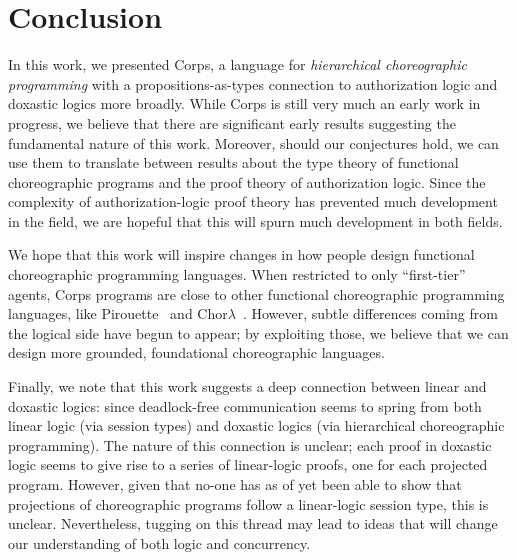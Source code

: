 \section{Conclusion}
\label{sec:conclusion}

In this work, we presented Corps, a language for \emph{hierarchical choreographic programming} with a propositions-as-types connection to authorization logic and doxastic logics more broadly.
While Corps is still very much an early work in progress, we believe that there are significant early results suggesting the fundamental nature of this work.
Moreover, should our conjectures hold, we can use them to translate between results about the type theory of functional choreographic programs and the proof theory of authorization logic.
Since the complexity of authorization-logic proof theory has prevented much development in the field, we are hopeful that this will spurn much development in both fields.

We hope that this work will inspire changes in how people design functional choreographic programming languages.
When restricted to only ``first-tier'' agents, Corps programs are close to  other functional choreographic programming languages, like Pirouette~\cite{HirschG22} and Chor$\lambda$~\cite{GraversenHM23,CruzFilipeGLMP21}.
However, subtle differences coming from the logical side have begun to appear; by exploiting those, we believe that we can design more grounded, foundational choreographic languages.

Finally, we note that this work suggests a deep connection between linear and doxastic logics: since deadlock-free communication seems to spring from both linear logic (via session types) and doxastic logics (via hierarchical choreographic programming).
The nature of this connection is unclear; each proof in doxastic logic seems to give rise to a series of linear-logic proofs, one for each projected program.
However, given that no-one has as of yet been able to show that projections of choreographic programs follow a linear-logic session type, this is unclear.
Nevertheless, tugging on this thread may lead to ideas that will change our understanding of both logic and concurrency.

